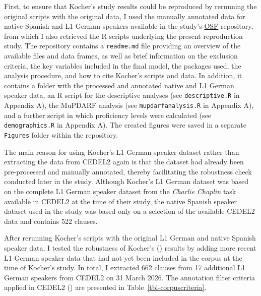 \documentclass[
  letterpaper,
  DIV=11,
  numbers=noendperiod]{scrartcl}
\begin{document}
First, to ensure that Kocher's study results could be reproduced by
rerunning the original scripts with the original data, I used the
manually annotated data for native Spanish and L1 German speakers
available in the study's \href{https://osf.io/zr9wh/overview}{OSF}
repository, from which I also retrieved the R scripts underlying the
present reproduction study. The repository contains a \texttt{readme.md}
file providing an overview of the available files and data frames, as
well as brief information on the exclusion criteria, the key variables
included in the final model, the packages used, the analysis procedure,
and how to cite Kocher's scripts and data. In addition, it contains a
folder with the processed and annotated native and L1 German speaker
data, an R script for the descriptive analyses (see
\texttt{descriptive.R} in Appendix A), the MuPDARF analysis (see
\texttt{mupdarfanalysis.R} in Appendix A), and a further script in which
proficiency levels were calculated (see \texttt{demographics.R} in
Appendix A). The created figures were saved in a separate
\texttt{Figures} folder within the repository.

The main reason for using Kocher's L1 German speaker dataset rather than
extracting the data from CEDEL2 again is that the dataset had already
been pre-processed and manually annotated, thereby facilitating the
robustness check conducted later in the study. Although Kocher's L1
German dataset was based on the complete L1 German speaker dataset from
the \emph{Charlie Chaplin} task available in CEDEL2 at the time of their
study, the native Spanish speaker dataset used in the study was based
only on a selection of the available CEDEL2 data and contains 522
clauses.

After rerunning Kocher's scripts with the original L1 German and native
Spanish speaker data, I tested the robustness of Kocher's
() results by adding
more recent L1 German speaker data that had not yet been included in the
corpus at the time of Kocher's study. In total, I extracted 662 clauses
from 17 additional L1 German speakers from CEDEL2 on 31 March 2026. The
annotation filter criteria applied in CEDEL2
() are presented in
Table~\ref{tbl-corpuscriteria}.
\end{document}
